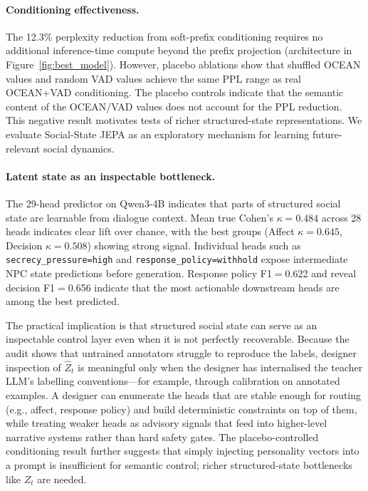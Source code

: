 \documentclass[11pt]{article}
\begin{document}
\paragraph{Conditioning effectiveness.}
The 12.3\% perplexity reduction from soft-prefix conditioning requires no additional inference-time compute beyond the prefix projection (architecture in Figure~\ref{fig:best_model}).
However, placebo ablations show that shuffled OCEAN values and random VAD values achieve the same PPL range as real OCEAN+VAD conditioning.
The placebo controls indicate that the semantic content of the OCEAN/VAD values does not account for the PPL reduction.
This negative result motivates tests of richer structured-state representations. We evaluate Social-State JEPA as an exploratory mechanism for learning future-relevant social dynamics.

\paragraph{Latent state as an inspectable bottleneck.}
The 29-head predictor on Qwen3-4B indicates that parts of structured social state are learnable from dialogue context.
Mean true Cohen's $\kappa=0.484$ across 28 heads indicates clear lift over chance, with the best groups (Affect $\kappa=0.645$, Decision $\kappa=0.508$) showing strong signal.
Individual heads such as \texttt{secrecy\_pressure=high} and \texttt{response\_policy=withhold} expose intermediate NPC state predictions before generation.
Response policy F1$=$0.622 and reveal decision F1$=$0.656 indicate that the most actionable downstream heads are among the best predicted.


The practical implication is that structured social state can serve as an inspectable control layer even when it is not perfectly recoverable. Because the audit shows that untrained annotators struggle to reproduce the labels, designer inspection of $\hat{Z}_t$ is meaningful only when the designer has internalised the teacher LLM's labelling conventions---for example, through calibration on annotated examples. A designer can enumerate the heads that are stable enough for routing (e.g., affect, response policy) and build deterministic constraints on top of them, while treating weaker heads as advisory signals that feed into higher-level narrative systems rather than hard safety gates. The placebo-controlled conditioning result further suggests that simply injecting personality vectors into a prompt is insufficient for semantic control; richer structured-state bottlenecks like $Z_t$ are needed.
\end{document}
